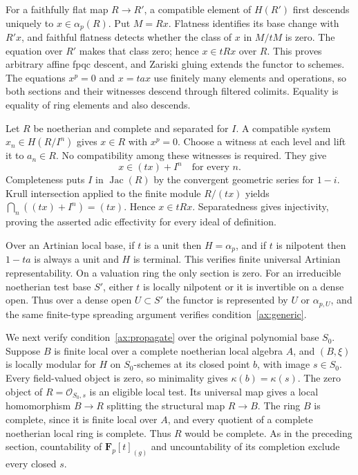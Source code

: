 \documentclass[11pt]{article}
\theoremstyle{definition}\newtheorem{definition}[theorem]{Definition}
\theoremstyle{remark}\newtheorem{remark}[theorem]{Remark}
\newcommand{\OO}{\mathcal O}
\newcommand{\F}{\mathbf F}
\newcommand{\Jac}{\operatorname{Jac}}
\begin{document}
For a faithfully flat map $R\to R'$, a compatible element of $H(R')$ first descends uniquely to $x\in\alpha_p(R)$. Put $M=Rx$. Flatness identifies its base change with $R'x$, and faithful flatness detects whether the class of $x$ in $M/tM$ is zero. The equation over $R'$ makes that class zero; hence $x\in tRx$ over $R$. This proves arbitrary affine fpqc descent, and Zariski gluing extends the functor to schemes. The equations $x^p=0$ and $x=tax$ use finitely many elements and operations, so both sections and their witnesses descend through filtered colimits. Equality is equality of ring elements and also descends.

Let $R$ be noetherian and complete and separated for $I$. A compatible system $x_n\in H(R/I^n)$ gives $x\in R$ with $x^p=0$. Choose a witness at each level and lift it to $a_n\in R$. No compatibility among these witnesses is required. They give
\[
 x\in (tx)+I^n\quad\text{for every }n.
\]
Completeness puts $I$ in $\Jac(R)$ by the convergent geometric series for $1-i$. Krull intersection applied to the finite module $R/(tx)$ yields $\bigcap_n((tx)+I^n)=(tx)$. Hence $x\in tRx$. Separatedness gives injectivity, proving the asserted adic effectivity for every ideal of definition.

Over an Artinian local base, if $t$ is a unit then $H=\alpha_p$, and if $t$ is nilpotent then $1-ta$ is always a unit and $H$ is terminal. This verifies finite universal Artinian representability. On a valuation ring the only section is zero. For an irreducible noetherian test base $S'$, either $t$ is locally nilpotent or it is invertible on a dense open. Thus over a dense open $U\subset S'$ the functor is represented by $U$ or $\alpha_{p,U}$, and the same finite-type spreading argument verifies condition~\ref{ax:generic}.

We next verify condition~\ref{ax:propagate} over the original polynomial base $S_0$. Suppose $B$ is finite local over a complete noetherian local algebra $A$, and $(B,\xi)$ is locally modular for $H$ on $S_0$-schemes at its closed point $b$, with image $s\in S_0$. Every field-valued object is zero, so minimality gives $\kappa(b)=\kappa(s)$. The zero object of $R=\OO_{S_0,s}$ is an eligible local test. Its universal map gives a local homomorphism $B\to R$ splitting the structural map $R\to B$. The ring $B$ is complete, since it is finite local over $A$, and every quotient of a complete noetherian local ring is complete. Thus $R$ would be complete. As in the preceding section, countability of $\F_p[t]_{(g)}$ and uncountability of its completion exclude every closed $s$.
\end{document}
